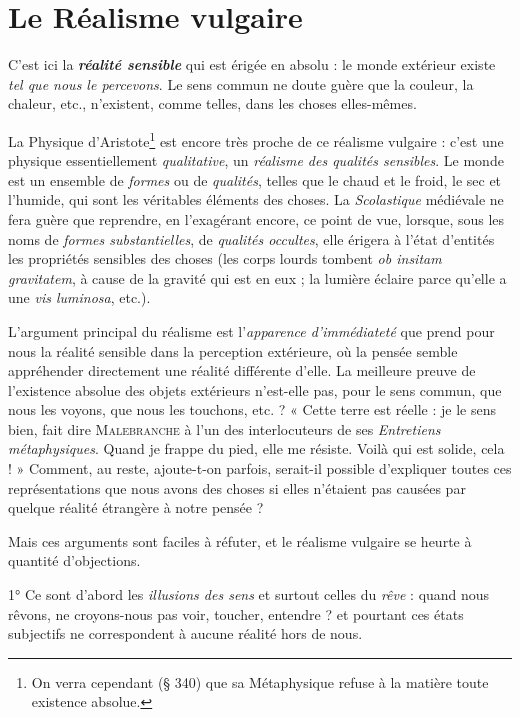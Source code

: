 \section{Le Réalisme vulgaire}%
C'est ici la \textbf{\textit {réalité sensible}} qui
est érigée en absolu : le monde extérieur existe {\it tel que nous le percevons}.
Le sens commun ne doute guère que la couleur, la chaleur, etc.,
n'existent, comme telles, dans les choses elles-mêmes.

La Physique d'Aristote\footnote{On verra cependant (§ 340) que sa Métaphysique refuse à la matière toute existence
absolue.} est encore très proche de ce réalisme vulgaire :
c'est une physique essentiellement {\it qualitative}, un \textsf{\textit {réalisme des qualités sensibles}}.
Le monde est un ensemble de {\it formes} ou de {\it qualités}, telles que le chaud et le
froid, le sec et l’humide, qui sont les véritables éléments des choses. La
{\it Scolastique} médiévale ne fera guère que reprendre, en l’exagérant encore,
ce point de vue, lorsque, sous les noms de {\it formes substantielles}, de {\it qualités
occultes}, elle érigera à l'état d’entités les propriétés sensibles des choses
(les corps lourds tombent {\it ob insitam gravitatem}, à cause de la gravité qui
est en eux ; la lumière éclaire parce qu’elle a une {\it vis luminosa}, etc.).

L’argument principal du réalisme est l'{\it apparence d'immédiateté}
que prend pour nous la réalité sensible dans la perception extérieure,
où la pensée semble appréhender directement une réalité différente
d’elle. La meilleure preuve de l’existence absolue des objets extérieurs
n'est-elle pas, pour le sens commun, que nous les voyons, que nous les
touchons, etc. ? « Cette terre est réelle : je le sens bien, fait dire
\textsc{Malebranche} à l’un des interlocuteurs de ses {\it Entretiens métaphysiques}.
Quand je frappe du pied, elle me résiste. Voilà qui est solide,
cela ! » Comment, au reste, ajoute-t-on parfois, serait-il possible
d’expliquer toutes ces représentations que nous avons des choses si
elles n'étaient pas causées par quelque réalité étrangère à notre pensée ?

Mais ces arguments sont faciles à réfuter, et le réalisme vulgaire
se heurte à quantité d’objections.

1° Ce sont d’abord les {\it illusions des sens} et surtout celles du {\it rêve} :
quand nous rêvons, ne croyons-nous pas voir, toucher, entendre ?
et pourtant ces états subjectifs ne correspondent à aucune réalité
hors de nous.

